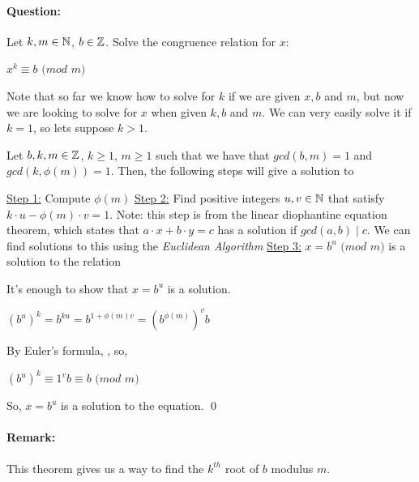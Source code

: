 \documentclass[../main.tex]{subfiles}
\begin{document}
\paragraph{Question:}
Let $k,m \in \mathbb{N}$, $b \in \mathbb{Z}$. Solve the congruence relation for $x$: \\
\centerline{$x^k \equiv b$ $(mod$ $m)$}
Note that so far we know how to solve for $k$ if we are given $x,b$ and $m$, but now we are looking to solve for $x$ when given $k,b$ and $m$. \sspace
We can very easily solve it if $k=1$, so lets suppose $k>1$.
\begin{thm}
    Let $b,k,m \in \mathbb{Z}$, $k \geq 1$, $m \geq 1$ such that we have that $gcd(b,m)=1$ and $gcd(k, \phi(m))=1$. Then, the following steps will give a solution to \\
    \centerline{}
    \underline{Step 1:} Compute $\phi(m)$ \sspace
    \underline{Step 2:} Find positive integers $u,v \in \mathbb{N}$ that satisfy $k \cdot u - \phi(m) \cdot v = 1$. Note: this step is from the linear diophantine equation theorem, which states that $a\cdot x + b \cdot y = c$ has a solution if $gcd(a,b) \mid c$. We can find solutions to this using the \textit{Euclidean Algorithm} \sspace
    \underline{Step 3:} $x=b^u$ $(mod$ $m)$ is a solution to the relation
\end{thm}

\begin{pf}
    It's enough to show that $x=b^u$ is a solution.
    \begin{center}
        $(b^u)^k = b^{ku} = b^{1+ \phi(m)v} = (b^{\phi(m)})^vb$
    \end{center}
    By Euler's formula, , so, \\
    \centerline{$(b^u)^k \equiv 1^vb \equiv b$ $(mod$ $m)$}
    So, $x=b^u$ is a solution to the equation. \qed
\end{pf}
\paragraph{Remark:} This theorem gives us a way to find the $k^{th}$ root of $b$ modulus $m$.
\end{document}

